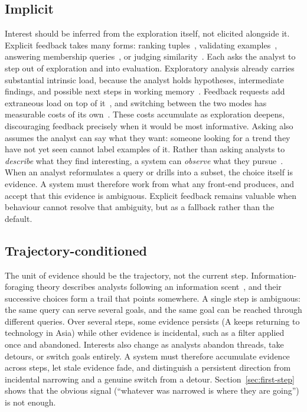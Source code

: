 \documentclass[sigconf]{acmart}
\begin{document}
\subsection{Implicit}
Interest should be inferred from the exploration itself, not elicited alongside it. Explicit feedback takes many forms: ranking tuples~\cite{dimitriadouAIDEActiveLearningBased2016}, validating examples~\cite{rezig2021dice}, answering membership queries~\cite{bonifati2014interactive}, or judging similarity~\cite{mottin2014exemplar}. Each asks the analyst to step out of exploration and into evaluation. Exploratory analysis already carries substantial intrinsic load, because the analyst holds hypotheses, intermediate findings, and possible next steps in working memory~\cite{sweller1988cognitive}. Feedback requests add extraneous load on top of it~\cite{sweller1998cognitive}, and switching between the two modes has measurable costs of its own~\cite{monsell2003task,rubinstein2001executive}. These costs accumulate as exploration deepens, discouraging feedback precisely when it would be most informative. Asking also assumes the analyst can say what they want: someone looking for a trend they have not yet seen cannot label examples of it. Rather than asking analysts to \emph{describe} what they find interesting, a system can \emph{observe} what they pursue~\cite{kelly2003implicit}. When an analyst reformulates a query or drills into a subset, the choice itself is evidence. A system must therefore work from what any front-end produces, and accept that this evidence is ambiguous. Explicit feedback remains valuable when behaviour cannot resolve that ambiguity, but as a fallback rather than the default.

\subsection{Trajectory-conditioned}
The unit of evidence should be the trajectory, not the current step. Information-foraging theory describes analysts following an information scent~\cite{pirolli2005information}, and their successive choices form a trail that points somewhere. A single step is ambiguous: the same query can serve several goals, and the same goal can be reached through different queries. Over several steps, some evidence persists (A keeps returning to technology in Asia) while other evidence is incidental, such as a filter applied once and abandoned. Interests also change as analysts abandon threads, take detours, or switch goals entirely. A system must therefore accumulate evidence across steps, let stale evidence fade, and distinguish a persistent direction from incidental narrowing and a genuine switch from a detour. Section~\ref{sec:first-step} shows that the obvious signal (``whatever was narrowed is where they are going'') is not enough.
\end{document}
